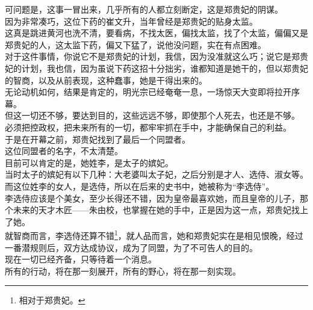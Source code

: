 \begin{multicols}{\theparacolNo}
可问题是，这事一冒出来，几乎所有的人都立刻断定，这是郑贵妃的阴谋。\\

因为非常凑巧，这位下药的崔文升，当年曾经是郑贵妃的贴身太监。\\

这真是跳进黄河也洗不清，要看病，不找太医，偏找太监，找了个太监，偏偏又是郑贵妃的人，这太监下药，偏又下猛了，说他没问题，实在有点困难。\\

对于这件事情，你说它不是郑贵妃的计划，我信，因为没准就这么巧；说它是郑贵妃的计划，我也信，因为虽说下药这招十分拙劣，谁都知道是她干的，但以郑贵妃的智商，以及从前表现，这种蠢事，她是干得出来的。\\

无论动机如何，结果是肯定的，明光宗已经奄奄一息，一场惊天大变即将拉开序幕。\\

但这一切还不够，要达到目的，这些远远不够，即使那个人死去，也还是不够。\\

必须把控政权，把未来所有的一切，都牢牢抓在手中，才能确保自己的利益。\\

于是在开幕之前，郑贵妃找到了最后一个同盟者。\\

这位同盟者的名字，不太清楚。\\

目前可以肯定的是，她姓李，是太子的嫔妃。\\

当时太子的嫔妃有以下几种：大老婆叫太子妃，之后分别是才人、选侍、淑女等。\\

而这位姓李的女人，是选侍，所以在后来的史书中，她被称为“李选侍”。\\

李选侍应该是个美女，至少长得还不错，因为皇帝最喜欢她，而且皇帝的儿子，那个未来的天才木匠——朱由校，也掌握在她的手中，正是因为这一点，郑贵妃找上了她。\\

就智商而言，李选侍还算不错\footnote{相对于郑贵妃。}，就人品而言，她和郑贵妃实在是相见恨晚，经过一番潜规则后，双方达成协议，成为了同盟，为了不可告人的目的。\\

现在一切已经齐备，只等待着一个消息。\\

所有的行动，将在那一刻展开，所有的野心，将在那一刻实现。\\


\end{multicols}
